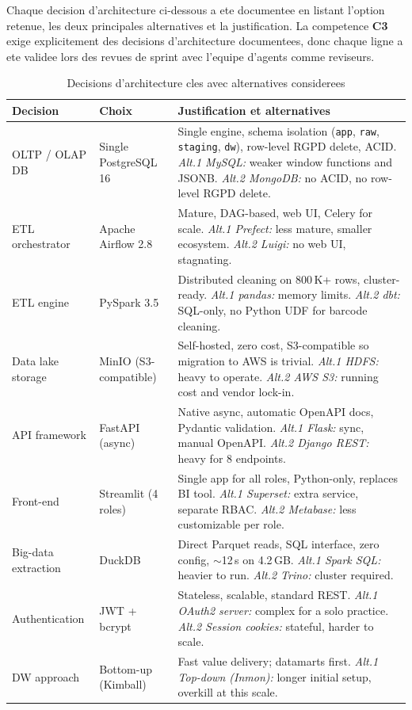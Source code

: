 \documentclass[a4paper,11pt,oneside,openany]{report}
\newcommand{\competence}[1]{\textbf{\textcolor{ntgreen}{#1}}}
\begin{document}
Chaque decision d'architecture ci-dessous a ete documentee en
listant l'option retenue, les deux principales alternatives et la
justification. La competence \competence{C3} exige explicitement des
decisions d'architecture documentees, donc chaque ligne a ete validee
lors des revues de sprint avec l'equipe d'agents comme
reviseurs.

\begin{table}[H]
\centering
\caption{Decisions d'architecture cles avec alternatives considerees}
\label{tab:arch-decisions}
\begin{tabularx}{\textwidth}{L{3cm} L{2.5cm} L{7.5cm}}
\toprule
\textbf{Decision} & \textbf{Choix} & \textbf{Justification et alternatives} \\
\midrule
OLTP / OLAP DB & Single PostgreSQL 16 & Single engine, schema isolation (\texttt{app}, \texttt{raw}, \texttt{staging}, \texttt{dw}), row-level RGPD delete, ACID. \textit{Alt.1 MySQL:} weaker window functions and JSONB. \textit{Alt.2 MongoDB:} no ACID, no row-level RGPD delete. \\
ETL orchestrator & Apache Airflow 2.8 & Mature, DAG-based, web UI, Celery for scale. \textit{Alt.1 Prefect:} less mature, smaller ecosystem. \textit{Alt.2 Luigi:} no web UI, stagnating. \\
ETL engine & PySpark 3.5 & Distributed cleaning on 800\,K+ rows, cluster-ready. \textit{Alt.1 pandas:} memory limits. \textit{Alt.2 dbt:} SQL-only, no Python UDF for barcode cleaning. \\
Data lake storage & MinIO (S3-compatible) & Self-hosted, zero cost, S3-compatible so migration to AWS is trivial. \textit{Alt.1 HDFS:} heavy to operate. \textit{Alt.2 AWS S3:} running cost and vendor lock-in. \\
API framework & FastAPI (async) & Native async, automatic OpenAPI docs, Pydantic validation. \textit{Alt.1 Flask:} sync, manual OpenAPI. \textit{Alt.2 Django REST:} heavy for 8 endpoints. \\
Front-end & Streamlit (4 roles) & Single app for all roles, Python-only, replaces BI tool. \textit{Alt.1 Superset:} extra service, separate RBAC. \textit{Alt.2 Metabase:} less customizable per role. \\
Big-data extraction & DuckDB & Direct Parquet reads, SQL interface, zero config, $\sim$12\,s on 4.2\,GB. \textit{Alt.1 Spark SQL:} heavier to run. \textit{Alt.2 Trino:} cluster required. \\
Authentication & JWT + bcrypt & Stateless, scalable, standard REST. \textit{Alt.1 OAuth2 server:} complex for a solo practice. \textit{Alt.2 Session cookies:} stateful, harder to scale. \\
DW approach & Bottom-up (Kimball) & Fast value delivery; datamarts first. \textit{Alt.1 Top-down (Inmon):} longer initial setup, overkill at this scale. \\
\bottomrule
\end{tabularx}
\end{table}
\end{document}
